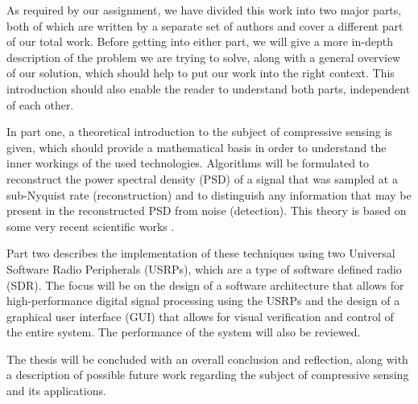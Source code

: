 \documentclass[a4paper, openany, oneside]{memoir}
\begin{document}
As required by our assignment, we have divided this work into two major parts, both of which are written by a separate set of authors and cover a different part of our total work. Before getting into either part, we will give a more in-depth description of the problem we are trying to solve, along with a general overview of our solution, which should help to put our work into the right context. This introduction should also enable the reader to understand both parts, independent of each other.

In part one, a theoretical introduction to the subject of compressive sensing is given, which should provide a mathematical basis in order to understand the inner workings of the used technologies. Algorithms will be formulated to reconstruct the power spectral density (PSD) of a signal that was sampled at a sub-Nyquist rate (reconstruction) and to distinguish any information that may be present in the reconstructed PSD from noise (detection). This theory is based on some very recent scientific works \cite{ariananda2011multicoset, ariananda2012compressive}.

Part two describes the implementation of these techniques using two Universal Software Radio Peripherals (USRPs), which are a type of software defined radio (SDR). The focus will be on the design of a software architecture that allows for high-performance digital signal processing using the USRPs and the design of a graphical user interface (GUI) that allows for visual verification and control of the entire system. The performance of the system will also be reviewed.

The thesis will be concluded with an overall conclusion and reflection, along with a description of possible future work regarding the subject of compressive sensing and its applications.
\end{document}
